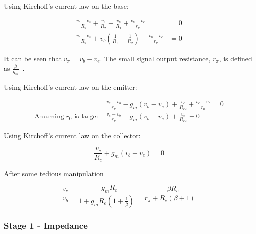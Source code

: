 \documentclass[a4paper,11pt]{article}
\begin{document}
            Using Kirchoff's current law on the base:

            \begin{subequations}
            \begin{align}
                \frac{v_b - v_s}{R_s} + \frac{v_b}{R_2} + \frac{v_b}{R_1} + \frac{v_b - v_e}{r_\pi} &= 0\\
                \frac{v_b - v_s}{R_s} + v_b \left(\frac{1}{R_1} + \frac{1}{R_2} \right) + \frac{v_b - v_e}{r_\pi} &= 0 \label{eq:kclBase}
            \end{align}
            \end{subequations}

            It can be seen that $v_\pi = v_b - v_e$. The small signal output resistance, $r_\pi$, is defined as $\frac{\beta}{g_m}$~\cite[p. 29]{ADAIC}.

            Using Kirchoff's current law on the emitter:

            \begin{subequations}
            \begin{align}
                &\frac{v_e - v_b}{r_\pi} - g_m (v_b - v_e) + \frac{v_e}{R_{e2}} + \frac{v_e - v_c}{r_0} = 0\\
                \textrm{Assuming $r_0$ is large: } &\frac{v_e - v_b}{r_\pi} - g_m (v_b - v_e) + \frac{v_e}{R_{e2}} = 0 \label{eq:kclEmitter}
            \end{align}
            \end{subequations}

            Using Kirchoff's current law on the collector:

            \begin{equation} \label{eq:kclCollector}
                \frac{v_c}{R_c} + g_m(v_b - v_e) = 0
            \end{equation}

            After some tedious manipulation
            
            \begin{equation} \label{eq:s1gain}
                \frac{v_c}{v_b} = \frac{-g_m R_c}{1 + g_m R_e \left( 1+ \frac{1}{\beta} \right) }
                                = \frac{-\beta R_c}{r_{\pi} + R_e (\beta + 1)}
            \end{equation}
            
            \subsubsection{Stage 1 - Impedance}
                
\end{document}
